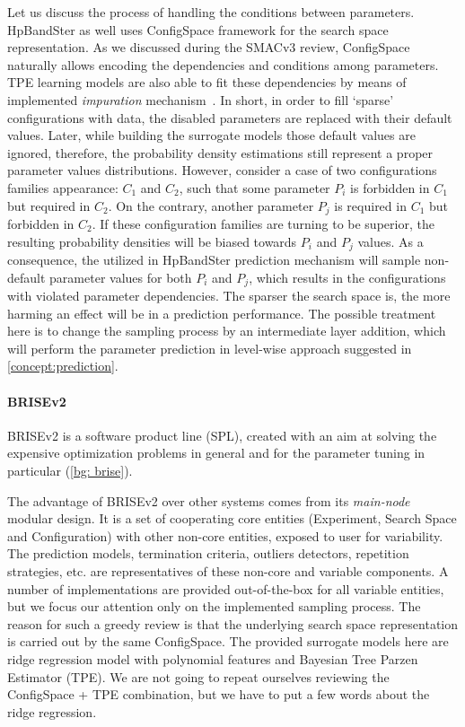 Let us discuss the process of handling the conditions between parameters. HpBandSter as well uses ConfigSpace framework for the search space representation. As we discussed during the SMACv3 review, ConfigSpace naturally allows encoding the dependencies and conditions among parameters. TPE learning models are also able to fit these dependencies by means of implemented \emph{impuration} mechanism~\cite{levesque2017bayesian}. In short, in order to fill `sparse' configurations with data, the disabled parameters are replaced with their default values. Later, while building the surrogate models those default values are ignored, therefore, the probability density estimations still represent a proper parameter values distributions. However, consider a case of two configurations families appearance: $C_1$ and $C_2$, such that some parameter $P_i$ is forbidden in $C_1$ but required in $C_2$. On the contrary, another parameter $P_j$ is required in $C_1$ but forbidden in $C_2$. If these configuration families are turning to be superior, the resulting probability densities will be biased towards $P_i$ and $P_j$ values. As a consequence, the utilized in HpBandSter prediction mechanism will sample non-default parameter values for both $P_i$ and $P_j$, which results in the configurations with violated parameter dependencies. The sparser the search space is, the more harming an effect will be in a prediction performance. The possible treatment here is to change the sampling process by an intermediate layer addition, which will perform the parameter prediction in level-wise approach suggested in \cref{concept:prediction}.

\paragraph{BRISEv2}
BRISEv2 is a software product line (SPL), created with an aim at solving the expensive optimization problems in general and for the parameter tuning in particular (\cref{bg: brise}).

The advantage of BRISEv2 over other systems comes from its \emph{main-node} modular design. It is a set of cooperating core entities (Experiment, Search Space and Configuration) with other non-core entities, exposed to user for variability. The prediction models, termination criteria, outliers detectors, repetition strategies, etc. are representatives of these non-core and variable components. A number of implementations are provided out-of-the-box for all variable entities, but we focus our attention only on the implemented sampling process. The reason for such a greedy review is that the underlying search space representation is carried out by the same ConfigSpace. The provided surrogate models here are ridge regression model with polynomial features and Bayesian Tree Parzen Estimator (TPE). We are not going to repeat ourselves reviewing the ConfigSpace + TPE combination, but we have to put a few words about the ridge regression.

